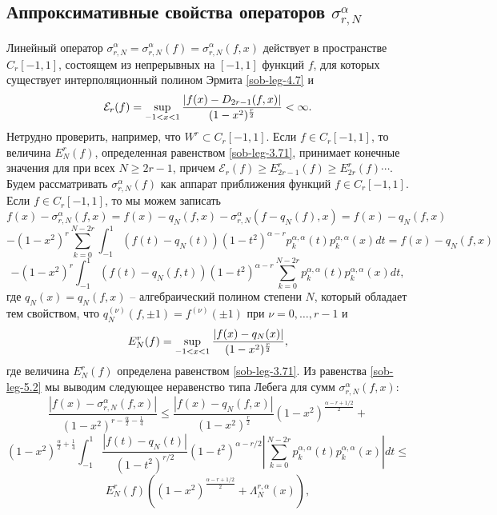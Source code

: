 \subsection{Аппроксимативные свойства операторов $\sigma_{r,N}^\alpha$}

   Линейный оператор $\sigma_{r,N}^\alpha=\sigma_{r,N}^\alpha(f)=\sigma_{r,N}^\alpha(f,x)$  действует в пространстве  $C_r[-1,1]$, состоящем из непрерывных на $[-1,1]$ функций $f$, для которых существует интерполяционный полином Эрмита \eqref{sob-leg-4.7} и   \begin{equation}\label{sob-leg-5.1}
 \mathcal{E}_r(f)=\sup_{-1<x<1}{|f(x)-D_{2r-1}(f,x)|\over (1-x^2)^\frac{r}{2}}<\infty.
\end{equation}
Нетрудно проверить, например, что $W^r\subset C_r[-1,1]$. Если $f\in C_r[-1,1]$, то  величина $E_N^r(f)$, определенная равенством \eqref{sob-leg-3.71}, принимает конечные значения для при всех $N\ge 2r-1$, причем $\mathcal{E}_r(f)\ge E_{2r-1}^r(f)\ge E_{2r}^r(f)\cdots$. Будем рассматривать $\sigma_{r,N}^\alpha(f)$ как аппарат приближения функций $f\in C_r[-1,1]$.
Если $f\in C_r[-1,1]$, то мы можем записать
$$
f(x)-\sigma_{r,N}^\alpha(f,x)=
 f(x)-q_N(f,x)-\sigma_{r,N}^\alpha(f-q_N(f),x)=f(x)-q_N(f,x)
$$
$$
-(1-x^2)^r \sum_{k=0}^{N-2r} \int_{-1}^1(f(t)-q_N(t))(1-t^2)^{\alpha-r} p_{k}^{\alpha,\alpha}(t)p_{k}^{\alpha,\alpha}(x)dt=f(x)-q_N(f,x)
$$
\begin{equation}\label{sob-leg-5.2}
-(1-x^2)^r\int_{-1}^1(f(t)-q_N(f,t))(1-t^2)^{\alpha-r}\sum_{k=0}^{N-2r}  p_{k}^{\alpha,\alpha}(t)p_{k}^{\alpha,\alpha}(x)dt,
\end{equation}
где $q_N(x)=q_N(f,x)$ -- алгебраический полином  степени $N$, который обладает тем свойством, что $q^{(\nu)}_N(f,\pm1)=f^{(\nu)}(\pm1)$ при $\nu=0,\ldots,r-1$  и
\begin{equation}\label{sob-leg-5.3}
E_N^r(f)=\sup_{-1<x<1}{|f(x)-q_N(x)|\over (1-x^2)^\frac{r}{2}},
\end{equation}
где величина $E_N^r(f)$ определена равенством \eqref{sob-leg-3.71}. Из равенства \eqref{sob-leg-5.2} мы выводим следующее неравенство типа Лебега для сумм $\sigma_{r,N}^\alpha(f,x)$:
$$
\frac{|f(x)-\sigma_{r,N}^\alpha(f,x)|}{(1-x^2)^{r-\frac{\alpha}{2}-\frac14}}\le \frac{|f(x)-q_N(f,x)|}{(1-x^2)^\frac{r}{2}}(1-x^2)^\frac{\alpha-r+1/2}{2}+
$$
$$
(1-x^2)^{\frac{\alpha}{2}+\frac14}  \int_{-1}^1\frac{|f(t)-q_N(t)|}{(1-t^2)^{r/2}}(1-t^2)^{\alpha-r/2} \left|\sum_{k=0}^{N-2r}p_{k}^{\alpha,\alpha}(t)p_{k}^{\alpha,\alpha}(x)\right|dt\le
$$
\begin{equation}\label{sob-leg-5.4}
E_N^r(f)\left((1-x^2)^\frac{\alpha-r+1/2}{2}+\Lambda^{r,\alpha}_N(x)\right),
\end{equation}
